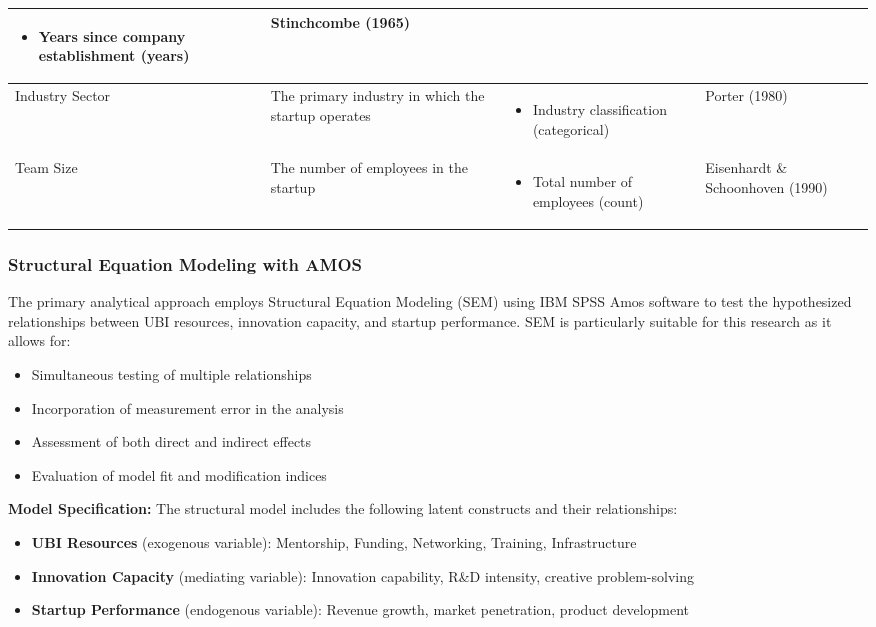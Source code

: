 \documentclass[../Main.tex]{subfiles}%
\begin{document}
\begin{longtable}{|p{2.5cm}|p{3.5cm}|p{5cm}|p{2.5cm}|}
	\begin{itemize}
		\item Years since company establishment (years)
	\end{itemize} & 
	Stinchcombe (1965) \\
	\hline
	Industry Sector & The primary industry in which the startup operates & 
	\begin{itemize}
		\item Industry classification (categorical)
	\end{itemize} & 
	Porter (1980) \\
	\hline
	Team Size & The number of employees in the startup & 
	\begin{itemize}
		\item Total number of employees (count)
	\end{itemize} & 
	Eisenhardt \& Schoonhoven (1990) \\
	\hline
	\end{longtable}
	
	\subsubsection{Structural Equation Modeling with AMOS}
	The primary analytical approach employs Structural Equation Modeling (SEM) using IBM SPSS Amos software to test the hypothesized relationships between UBI resources, innovation capacity, and startup performance. SEM is particularly suitable for this research as it allows for:
	\begin{itemize}
		\item Simultaneous testing of multiple relationships
		\item Incorporation of measurement error in the analysis
		\item Assessment of both direct and indirect effects
		\item Evaluation of model fit and modification indices
	\end{itemize}
	
	\textbf{Model Specification:}
	The structural model includes the following latent constructs and their relationships:
	\begin{itemize}
		\item \textbf{UBI Resources} (exogenous variable): Mentorship, Funding, Networking, Training, Infrastructure
		\item \textbf{Innovation Capacity} (mediating variable): Innovation capability, R\&D intensity, creative problem-solving
		\item \textbf{Startup Performance} (endogenous variable): Revenue growth, market penetration, product development
	\end{itemize}
	
\end{document}
